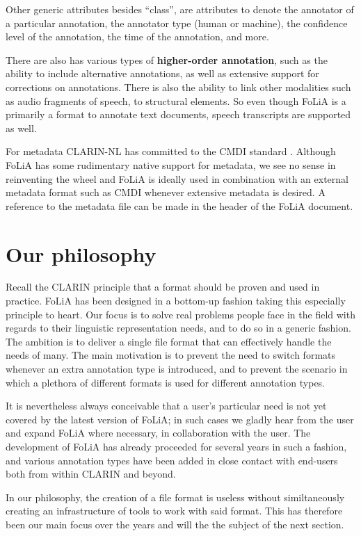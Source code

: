 \documentclass[a4paper,10pt,twoside]{article}
\begin{document}
Other generic attributes besides ``class'', are attributes to denote the
annotator of a particular annotation, the annotator type (human or machine),
the confidence level of the annotation, the time of the annotation, and more.

There are also has various types of \textbf{higher-order annotation}, such as
the ability to include alternative annotations, as well as extensive support
for corrections on annotations. There is also the ability to link other
modalities such as audio fragments of speech, to structural elements. So even
though FoLiA is a primarily a format to annotate text documents, speech
transcripts are supported as well. 

For metadata CLARIN-NL has committed to the CMDI standard \cite{CMDI}.
Although FoLiA has some rudimentary native support for metadata, we see no
sense in reinventing the wheel and FoLiA is ideally used in combination with an
external metadata format such as CMDI whenever extensive metadata is desired. A
reference to the metadata file can be made in the header of the FoLiA document.

\section{Our philosophy}

Recall the CLARIN principle that a format should be proven and used in
practice. FoLiA has been designed in a bottom-up fashion taking this especially
principle to heart. Our focus is to solve real problems people face in the field
with regards to their linguistic representation needs, and to do so in a
generic fashion. The ambition is to deliver a single file format that can
effectively handle the needs of many. The main motivation is to prevent the
need to switch formats whenever an extra annotation type is introduced, and to
prevent the scenario in which a plethora of different formats is used for
different annotation types.

It is nevertheless always conceivable that a user's particular need is not yet
covered by the latest version of FoLiA; in such cases we gladly hear from the
user and expand FoLiA where necessary, in collaboration with the user. The
development of FoLiA has already proceeded for several years in such a fashion,
and various annotation types have been added in close contact with end-users
both from within CLARIN and beyond.

In our philosophy, the creation of a file format is useless without
similtaneously creating an infrastructure of tools to work with said format.
This has therefore been our main focus over the years and will the the subject
of the next section.
\end{document}
